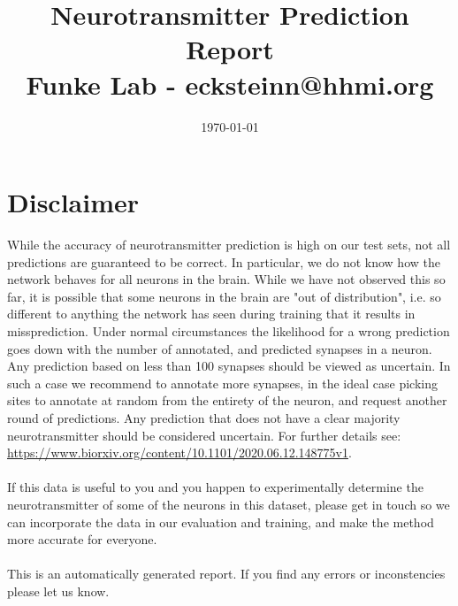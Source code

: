 \documentclass[a4paper,10pt]{article}
\begin{document}
   \title{Neurotransmitter Prediction Report\\ \small{Funke Lab - ecksteinn@hhmi.org}}
   \date{\today}
   \maketitle
   \section{Disclaimer}
   While the accuracy of neurotransmitter prediction is high on our test sets, not all predictions are guaranteed to be correct. In particular, we do not know how the network behaves for all neurons in the brain. While we have not observed this so far, 
   it is possible that some neurons in the brain are "out of distribution", i.e. so different to anything the network has seen during training that it results in missprediction.  
   Under normal circumstances the likelihood for a wrong prediction goes down with the number of annotated, and predicted synapses in a neuron. Any prediction based on less than 100 synapses should be
   viewed as uncertain. In such a case we recommend to annotate more synapses, in the ideal case picking sites to annotate at random from the entirety of the neuron, and request another round of predictions. Any prediction that does not have a clear majority neurotransmitter should be considered uncertain.  For further details see: \url{https://www.biorxiv.org/content/10.1101/2020.06.12.148775v1}. \\ \\
   If this data is useful to you and you happen to experimentally determine the neurotransmitter of some of the neurons in this dataset, please get in touch so we can incorporate the data in our evaluation and training, and make the method more accurate for everyone.\\ \\ This is an automatically
   generated report. If you find any errors or inconstencies please let us know.
\end{document}

